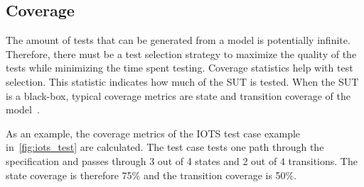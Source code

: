 \subsection{Coverage}\label{sec:coverage}
The amount of tests that can be generated from a model is potentially infinite. Therefore, there must be a test selection strategy to maximize the quality of the tests while minimizing the time spent testing. Coverage statistics help with test selection. This statistic indicates how much of the SUT is tested. When the SUT is a black-box, typical coverage metrics are state and transition coverage of the model~\cite{Lee:testing, Nachmanson:testing, Hasan:testing}.

As an example, the coverage metrics of the IOTS test case example in~\ref{fig:iots_test} are calculated. The test case tests one path through the specification and passes through 3 out of 4 states and 2 out of 4 transitions. The state coverage is therefore 75\% and the transition coverage is 50\%.

